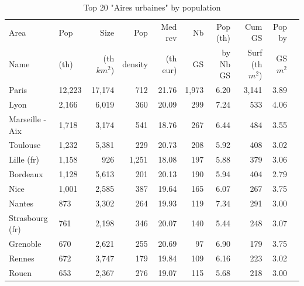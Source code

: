 \documentclass[11pt]{article}
\begin{document}
\begin{table}[H]
\caption{Top 20 "Aires urbaines" by population}
\small
\renewcommand{\arraystretch}{0.7}%

\begin{tabular}{llrrrrrrrr}
\toprule
Area             &      Pop   &   Size     &  Pop         & Med rev    & Nb         &  Pop (th)  & Cum GS          & Pop by       \\
Name             &      (th)  & (th $km^2$)&  density     & (th eur)   & GS         &  by Nb GS  & Surf (th $m^2$) & GS $m^2$  \\
\midrule
           Paris &     12,223 &     17,174 &          712 &      21.76 &      1,973 &       6.20 &      3,141 &        3.89 \\
            Lyon &      2,166 &      6,019 &          360 &      20.09 &        299 &       7.24 &        533 &        4.06 \\
 Marseille - Aix &      1,718 &      3,174 &          541 &      18.76 &        267 &       6.44 &        484 &        3.55 \\
        Toulouse &      1,232 &      5,381 &          229 &      20.73 &        208 &       5.92 &        408 &        3.02 \\
      Lille (fr) &      1,158 &        926 &        1,251 &      18.08 &        197 &       5.88 &        379 &        3.06 \\
        Bordeaux &      1,128 &      5,613 &          201 &      20.13 &        190 &       5.94 &        404 &        2.79 \\
            Nice &      1,001 &      2,585 &          387 &      19.64 &        165 &       6.07 &        267 &        3.75 \\
          Nantes &        873 &      3,302 &          264 &      19.93 &        119 &       7.34 &        291 &        3.00 \\
 Strasbourg (fr) &        761 &      2,198 &          346 &      20.07 &        140 &       5.44 &        248 &        3.07 \\
        Grenoble &        670 &      2,621 &          255 &      20.69 &         97 &       6.90 &        179 &        3.75 \\
          Rennes &        672 &      3,747 &          179 &      19.84 &        109 &       6.16 &        223 &        3.02 \\
           Rouen &        653 &      2,367 &          276 &      19.07 &        115 &       5.68 &        218 &        3.00 \\

\end{tabular}
\end{table}
\end{document}
